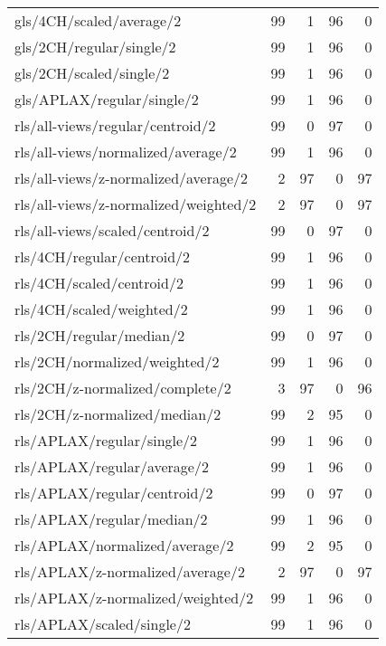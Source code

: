 \begin{longtable}{lrrrr}
    gls/4CH/scaled/average/2                  & 99 &  1 & 96 &  0 \\
    gls/2CH/regular/single/2                  & 99 &  1 & 96 &  0 \\
    gls/2CH/scaled/single/2                   & 99 &  1 & 96 &  0 \\
    gls/APLAX/regular/single/2                & 99 &  1 & 96 &  0 \\
    rls/all-views/regular/centroid/2          & 99 &  0 & 97 &  0 \\
    rls/all-views/normalized/average/2        & 99 &  1 & 96 &  0 \\
    rls/all-views/z-normalized/average/2      &  2 & 97 &  0 & 97 \\
    rls/all-views/z-normalized/weighted/2     &  2 & 97 &  0 & 97 \\
    rls/all-views/scaled/centroid/2           & 99 &  0 & 97 &  0 \\
    rls/4CH/regular/centroid/2                & 99 &  1 & 96 &  0 \\
    rls/4CH/scaled/centroid/2                 & 99 &  1 & 96 &  0 \\
    rls/4CH/scaled/weighted/2                 & 99 &  1 & 96 &  0 \\
    rls/2CH/regular/median/2                  & 99 &  0 & 97 &  0 \\
    rls/2CH/normalized/weighted/2             & 99 &  1 & 96 &  0 \\
    rls/2CH/z-normalized/complete/2           &  3 & 97 &  0 & 96 \\
    rls/2CH/z-normalized/median/2             & 99 &  2 & 95 &  0 \\
    rls/APLAX/regular/single/2                & 99 &  1 & 96 &  0 \\
    rls/APLAX/regular/average/2               & 99 &  1 & 96 &  0 \\
    rls/APLAX/regular/centroid/2              & 99 &  0 & 97 &  0 \\
    rls/APLAX/regular/median/2                & 99 &  1 & 96 &  0 \\
    rls/APLAX/normalized/average/2            & 99 &  2 & 95 &  0 \\
    rls/APLAX/z-normalized/average/2          &  2 & 97 &  0 & 97 \\
    rls/APLAX/z-normalized/weighted/2         & 99 &  1 & 96 &  0 \\
    rls/APLAX/scaled/single/2                 & 99 &  1 & 96 &  0 \\

\end{longtable}
